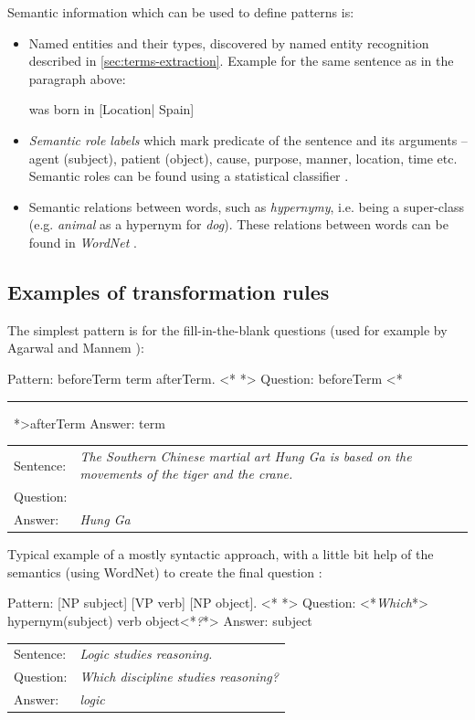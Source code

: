 \documentclass[12pt, twoside]{fithesis2}
\makeatletter
\renewcommand{\_}{\leavevmode \kern0.07em\vbox{\hrule width0.4em}}
\newcommand{\squarebullet}{\textcolor{black}{\raisebox{0.15em}{\rule{4pt}{4pt}}}}
\newcommand{\emptysquarebullet}{\textcolor{black}{\raisebox{0.10em}{\tiny$\square$}}}
\newenvironment{myItemize}{
  \begin{itemize}[leftmargin=2em,rightmargin=1em,itemsep=\parskip ,parsep=0em,topsep=0em,partopsep=0em]
  \renewcommand{\labelitemi}{\squarebullet}
  \renewcommand{\labelitemii}{\textbullet}
}{
  \end{itemize}
}
\newcommand{\arrowlinesplit}{%
  \noindent\makebox[\linewidth]{\raisebox{0.15em}{\rule{0.478\textwidth}{0.5pt}}%
  ~$\downarrow$~%
  \noindent\raisebox{0.15em}{\rule{0.478\textwidth}{0.5pt}}}%
}
\newcommand{\sentenceGap}{\rule{1.5cm}{0.4pt}~}
\newcommand{\transformationExample}[3]{%
\vspace{-0.5em}
\noindent %
\begin{tabularx}{\linewidth}{@{} l X @{}}
Sentence: & \emph{#1}\\
Question: & \emph{#2}\\
Answer:   & \emph{#3}\\
  \hline
\end{tabularx}
}
\makeatother
\begin{document}
\noindent
Semantic information which can be used to define patterns is:
\begin{myItemize}
\item Named entities and their types, discovered by named entity recognition described in \autoref{sec:terms-extraction}. Example for the same sentence as in the paragraph above:
\begin{code}
 was born in [Location| Spain]
\end{code}

\item \emph{Semantic role labels} which mark predicate of the sentence and its arguments -- agent (subject), patient (object), cause, purpose, manner, location, time etc.
Semantic roles can be found using a statistical classifier \cite{semantic-role-labeling}.
\begin{code}
\end{code}

\item Semantic relations between words, such as \emph{hypernymy}, i.e. being a super-class (e.g. \emph{animal} as a hypernym for \emph{dog}). These relations between words can be found in \emph{WordNet} \cite{wordnet}.
\end{myItemize}


\subsection*{Examples of transformation rules}

The simplest pattern is for the fill-in-the-blank questions
(used for example by Agarwal and Mannem \cite{question-gen-textbooks}):
\begin{code}
Pattern: beforeTerm term afterTerm.
<*\arrowlinesplit*>
Question: beforeTerm <*\sentenceGap*>afterTerm
Answer: term
\end{code}
\transformationExample%
{The Southern Chinese martial art Hung Ga is based on the movements of the tiger and the crane.}%
{The Southern Chinese martial art \sentenceGap is based on the movements of the tiger and the crane.}%
{Hung Ga}

\noindent
Typical example of a mostly syntactic approach,
with a little bit help of the semantics (using WordNet) to create the final question
\cite{question-gen-mitkov}:
\begin{code}
Pattern: [NP subject] [VP verb] [NP object].
<*\arrowlinesplit*>
Question: <*\emph{Which}*> hypernym(subject) verb object<*\emph{?}*>
Answer: subject
\end{code}
\transformationExample{Logic studies reasoning.}{Which discipline studies reasoning?}{logic}
\end{document}
